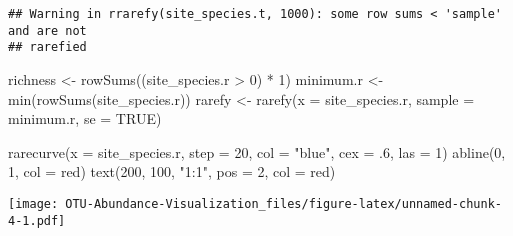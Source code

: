 \documentclass[
]{article}
\newenvironment{Shaded}{\begin{snugshade}}{\end{snugshade}}
\newcommand{\AttributeTok}[1]{\textcolor[rgb]{0.77,0.63,0.00}{#1}}
\newcommand{\ConstantTok}[1]{\textcolor[rgb]{0.00,0.00,0.00}{#1}}
\newcommand{\DecValTok}[1]{\textcolor[rgb]{0.00,0.00,0.81}{#1}}
\newcommand{\FunctionTok}[1]{\textcolor[rgb]{0.00,0.00,0.00}{#1}}
\newcommand{\NormalTok}[1]{#1}
\newcommand{\OtherTok}[1]{\textcolor[rgb]{0.56,0.35,0.01}{#1}}
\newcommand{\SpecialCharTok}[1]{\textcolor[rgb]{0.00,0.00,0.00}{#1}}
\newcommand{\StringTok}[1]{\textcolor[rgb]{0.31,0.60,0.02}{#1}}
\begin{document}
\begin{verbatim}
## Warning in rrarefy(site_species.t, 1000): some row sums < 'sample' and are not
## rarefied
\end{verbatim}

\begin{Shaded}
\begin{Highlighting}[]
\NormalTok{richness }\OtherTok{\textless{}{-}} \FunctionTok{rowSums}\NormalTok{((site\_species.r }\SpecialCharTok{\textgreater{}} \DecValTok{0}\NormalTok{) }\SpecialCharTok{*} \DecValTok{1}\NormalTok{)}
\NormalTok{minimum.r }\OtherTok{\textless{}{-}} \FunctionTok{min}\NormalTok{(}\FunctionTok{rowSums}\NormalTok{(site\_species.r))}
\NormalTok{rarefy }\OtherTok{\textless{}{-}} \FunctionTok{rarefy}\NormalTok{(}\AttributeTok{x =}\NormalTok{ site\_species.r, }\AttributeTok{sample =}\NormalTok{ minimum.r, }\AttributeTok{se =} \ConstantTok{TRUE}\NormalTok{)}

\FunctionTok{rarecurve}\NormalTok{(}\AttributeTok{x =}\NormalTok{ site\_species.r, }\AttributeTok{step =} \DecValTok{20}\NormalTok{, }\AttributeTok{col =} \StringTok{"blue"}\NormalTok{, }\AttributeTok{cex =}\NormalTok{ .}\DecValTok{6}\NormalTok{, }\AttributeTok{las =} \DecValTok{1}\NormalTok{)}
\FunctionTok{abline}\NormalTok{(}\DecValTok{0}\NormalTok{, }\DecValTok{1}\NormalTok{, }\AttributeTok{col =} \StringTok{\textquotesingle{}red\textquotesingle{}}\NormalTok{)}
\FunctionTok{text}\NormalTok{(}\DecValTok{200}\NormalTok{, }\DecValTok{100}\NormalTok{, }\StringTok{"1:1"}\NormalTok{, }\AttributeTok{pos =} \DecValTok{2}\NormalTok{, }\AttributeTok{col =} \StringTok{\textquotesingle{}red\textquotesingle{}}\NormalTok{)}
\end{Highlighting}
\end{Shaded}

\texttt{[image: OTU-Abundance-Visualization\_files/figure-latex/unnamed-chunk-4-1.pdf]}
\end{document}
